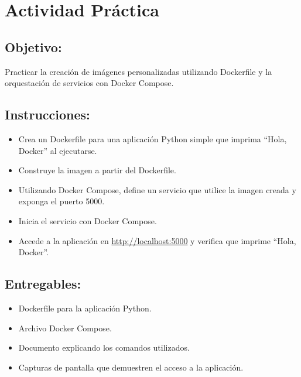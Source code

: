 \documentclass[
  a4paper,
  DIV=11,
  numbers=noendperiod,
  onepage,
  openany]{scrreprt}
\providecommand{\tightlist}{%
  \setlength{\itemsep}{0pt}\setlength{\parskip}{0pt}}\usepackage{longtable,booktabs,array}
\begin{document}
\hypertarget{actividad-pruxe1ctica-2}{%
\chapter{Actividad Práctica}\label{actividad-pruxe1ctica-2}}

\hypertarget{objetivo-2}{%
\section{Objetivo:}\label{objetivo-2}}

Practicar la creación de imágenes personalizadas utilizando Dockerfile y
la orquestación de servicios con Docker Compose.

\hypertarget{instrucciones-1}{%
\section{Instrucciones:}\label{instrucciones-1}}

\begin{itemize}
\tightlist
\item
  Crea un Dockerfile para una aplicación Python simple que imprima
  ``Hola, Docker'' al ejecutarse.
\item
  Construye la imagen a partir del Dockerfile.
\item
  Utilizando Docker Compose, define un servicio que utilice la imagen
  creada y exponga el puerto 5000.
\item
  Inicia el servicio con Docker Compose.
\item
  Accede a la aplicación en \url{http://localhost:5000} y verifica que
  imprime ``Hola, Docker''.
\end{itemize}

\hypertarget{entregables-2}{%
\section{Entregables:}\label{entregables-2}}

\begin{itemize}
\tightlist
\item
  Dockerfile para la aplicación Python.
\item
  Archivo Docker Compose.
\item
  Documento explicando los comandos utilizados.
\item
  Capturas de pantalla que demuestren el acceso a la aplicación.
\end{itemize}
\end{document}
